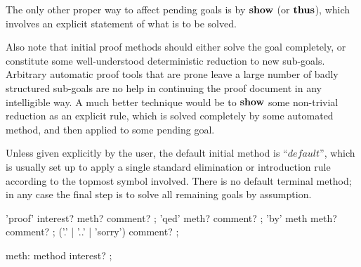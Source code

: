 The only other proper way to affect pending goals is by ${\mathord{\mathbf{show}}}$ (or
${\mathord{\mathbf{thus}}}$), which involves an explicit statement of what is to be solved.

\medskip

Also note that initial proof methods should either solve the goal completely,
or constitute some well-understood deterministic reduction to new sub-goals.
Arbitrary automatic proof tools that are prone leave a large number of badly
structured sub-goals are no help in continuing the proof document in any
intelligible way.  A much better technique would be to ${\mathord{\mathbf{show}}}$ some
non-trivial reduction as an explicit rule, which is solved completely by some
automated method, and then applied to some pending goal.

\medskip

Unless given explicitly by the user, the default initial method is
``$default$'', which is usually set up to apply a single standard elimination
or introduction rule according to the topmost symbol involved.  There is no
default terminal method; in any case the final step is to solve all remaining
goals by assumption.

\begin{rail}
  'proof' interest? meth? comment?
  ;
  'qed' meth? comment?
  ;
  'by' meth meth? comment?
  ;
  ('.' | '..' | 'sorry') comment?
  ;

  meth: method interest?
  ;
\end{rail}

